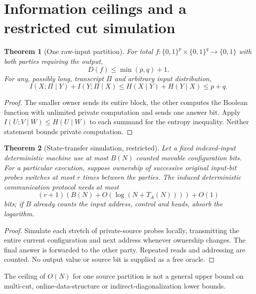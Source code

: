 \documentclass[11pt]{article}
\newtheorem{theorem}{Theorem}
\begin{document}
\section{Information ceilings and a restricted cut simulation}
\begin{theorem}[One raw-input partition]
For total $f:\{0,1\}^p\times\{0,1\}^q\rightarrow\{0,1\}$ with both parties requiring the output,
\[D(f)\le\min(p,q)+1.\]
For any, possibly long, transcript $\Pi$ and arbitrary input distribution,
\[I(X;\Pi\mid Y)+I(Y;\Pi\mid X)\le H(X\mid Y)+H(Y\mid X)\le p+q.\]
\end{theorem}
\begin{proof}
The smaller owner sends its entire block, the other computes the Boolean function with unlimited private computation and sends one answer bit. Apply $I(U;V\mid W)\le H(U\mid W)$ to each summand for the entropy inequality. Neither statement bounds private computation.
\end{proof}
\begin{theorem}[State-transfer simulation, restricted]
Let a fixed indexed-input deterministic machine use at most $B(N)$ counted movable configuration bits. For a particular execution, suppose ownership of successive original input-bit probes switches at most $r$ times between the parties. The induced deterministic communication protocol needs at most
\[(r+1)(B(N)+O(\log(N+T_A(N))))+O(1)\]
bits; if $B$ already counts the input address, control and heads, absorb the logarithm.
\end{theorem}
\begin{proof}
Simulate each stretch of private-source probes locally, transmitting the entire current configuration and next address whenever ownership changes. The final answer is forwarded to the other party. Repeated reads and addressing are counted. No output value or source bit is supplied as a free oracle.
\end{proof}
The ceiling of $O(N)$ for one source partition is not a general upper bound on multi-cut, online-data-structure or indirect-diagonalization lower bounds.
\end{document}

